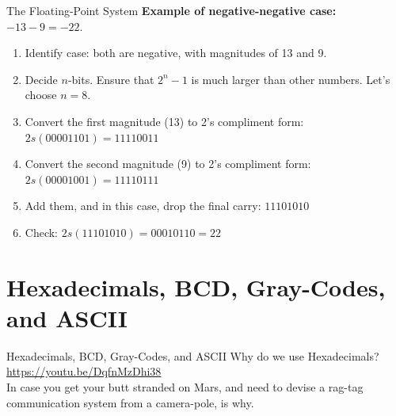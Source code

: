 \documentclass{beamer}
\begin{document}
\begin{frame}{The Floating-Point System}
\small
\textbf{Example of negative-negative case:} $-13-9=-22$. \\ \vspace{0.5cm}
\begin{enumerate}
\item Identify case: both are negative, with magnitudes of 13 and 9.
\item Decide $n$-bits.  Ensure that $2^n-1$ is much larger than other numbers.  Let's choose $n=8$.
\item Convert the first magnitude (13) to 2's compliment form: $2s(00001101) = 11110011$
\item Convert the second magnitude (9) to 2's compliment form: $2s(00001001) = 11110111$
\item Add them, and in this case, drop the final carry: $11101010$
\item Check: $2s(11101010) = 00010110 = 22$
\end{enumerate}
\end{frame}

\section{Hexadecimals, BCD, Gray-Codes, and ASCII}

\begin{frame}{Hexadecimals, BCD, Gray-Codes, and ASCII}
Why do we use Hexadecimals? \\ \vspace{0.5cm}
\url{https://youtu.be/DqfnMzDhi38} \\
In case you get your butt stranded on Mars, and need to devise a rag-tag communication system from a camera-pole, is why.
\end{frame}
\end{document}

